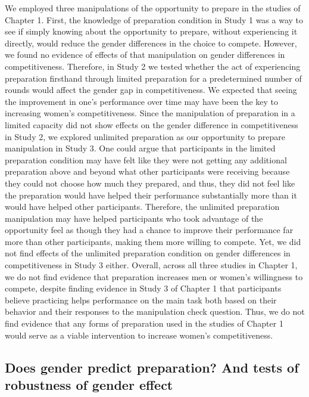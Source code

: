 \documentclass[letterpaper, nobind]{templates/ociamthesis}
\begin{document}
We employed three manipulations of the opportunity to prepare in the studies of Chapter 1. First, the knowledge of preparation condition in Study 1 was a way to see if simply knowing about the opportunity to prepare, without experiencing it directly, would reduce the gender differences in the choice to compete. However, we found no evidence of effects of that manipulation on gender differences in competitiveness. Therefore, in Study 2 we tested whether the act of experiencing preparation firsthand through limited preparation for a predetermined number of rounds would affect the gender gap in competitiveness. We expected that seeing the improvement in one's performance over time may have been the key to increasing women's competitiveness. Since the manipulation of preparation in a limited capacity did not show effects on the gender difference in competitiveness in Study 2, we explored unlimited preparation as our opportunity to prepare manipulation in Study 3. One could argue that participants in the limited preparation condition may have felt like they were not getting any additional preparation above and beyond what other participants were receiving because they could not choose how much they prepared, and thus, they did not feel like the preparation would have helped their performance substantially more than it would have helped other participants. Therefore, the unlimited preparation manipulation may have helped participants who took advantage of the opportunity feel as though they had a chance to improve their performance far more than other participants, making them more willing to compete. Yet, we did not find effects of the unlimited preparation condition on gender differences in competitiveness in Study 3 either. Overall, across all three studies in Chapter 1, we do not find evidence that preparation increases men or women's willingness to compete, despite finding evidence in Study 3 of Chapter 1 that participants believe practicing helps performance on the main task both based on their behavior and their responses to the manipulation check question. Thus, we do not find evidence that any forms of preparation used in the studies of Chapter 1 would serve as a viable intervention to increase women's competitiveness.

\hypertarget{does-gender-predict-preparation-and-tests-of-robustness-of-gender-effect}{%
\subsection{Does gender predict preparation? And tests of robustness of gender effect}\label{does-gender-predict-preparation-and-tests-of-robustness-of-gender-effect}}
\end{document}
